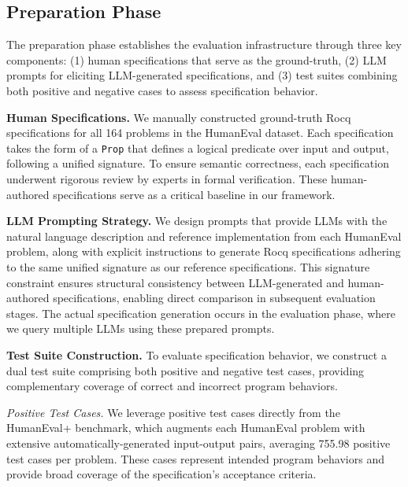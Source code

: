 \subsection{Preparation Phase}

The preparation phase establishes the evaluation infrastructure through three key components: (1) human specifications that serve as the ground-truth, (2) LLM prompts for eliciting LLM-generated specifications, and (3) test suites combining both positive and negative cases to assess specification behavior. 


\textbf{Human Specifications.}
We manually constructed ground-truth Rocq specifications for all 164 problems in the HumanEval dataset. Each specification takes the form of a \texttt{Prop} that defines a logical predicate over input and output, following a unified signature. To ensure semantic correctness, each specification underwent rigorous review by experts in formal verification. These human-authored specifications serve as a critical baseline in our framework.

\textbf{LLM Prompting Strategy.}
We design prompts that provide LLMs with the natural language description and reference implementation from each HumanEval problem, along with explicit instructions to generate Rocq specifications adhering to the same unified signature as our reference specifications. This signature constraint ensures structural consistency between LLM-generated and human-authored specifications, enabling direct comparison in subsequent evaluation stages. The actual specification generation occurs in the evaluation phase, where we query multiple LLMs using these prepared prompts.

\textbf{Test Suite Construction.}
To evaluate specification behavior, we construct a dual test suite comprising both positive and negative test cases, providing complementary coverage of correct and incorrect program behaviors.

\textit{Positive Test Cases.} 
 We leverage positive test cases directly from the HumanEval+ benchmark, which augments each HumanEval problem with extensive automatically-generated input-output pairs, averaging 755.98 positive test cases per problem. These cases represent intended program behaviors and provide broad coverage of the specification's acceptance criteria.



